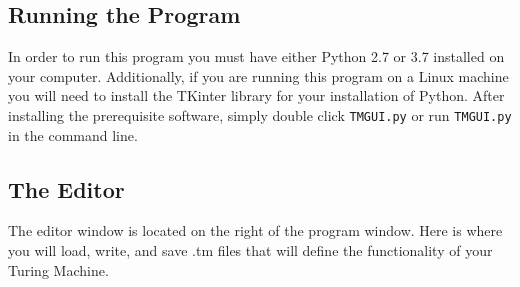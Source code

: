 \documentclass[12pt,letterpaper]{article}
\begin{document}
\subsection{Running the Program}
	\noindent In order to run this program you must have either Python 2.7 or 3.7 installed on your computer. Additionally, if you are running this program on a Linux machine you will need to install the TKinter library for your installation of Python. After installing the prerequisite software, simply double click \texttt{TMGUI.py} or run \texttt{TMGUI.py} in the command line.

\subsection{The Editor}
	\noindent The editor window is located on the right of the program window. Here is where you will load, write, and save .tm files that will define the functionality of your Turing Machine.
	
\end{document}
